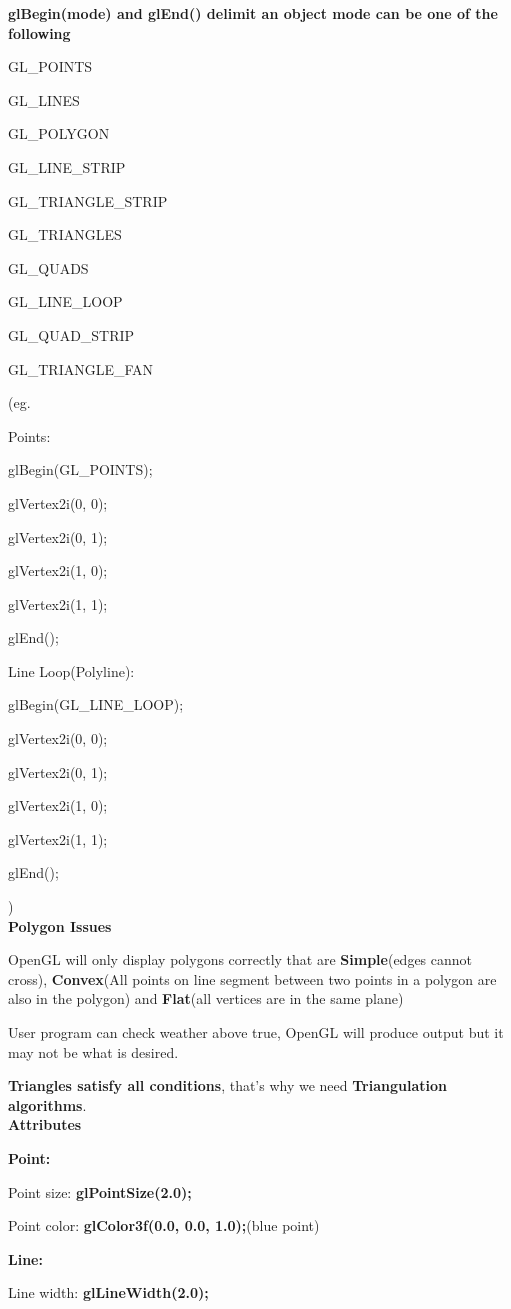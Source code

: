 \documentclass[]{report}
\begin{document}
\textbf{glBegin(mode) and glEnd() delimit an object mode can be one of the following}

GL\_POINTS

GL\_LINES

GL\_POLYGON

GL\_LINE\_STRIP

GL\_TRIANGLE\_STRIP

GL\_TRIANGLES

GL\_QUADS

GL\_LINE\_LOOP

GL\_QUAD\_STRIP

GL\_TRIANGLE\_FAN

(eg.

Points:

glBegin(GL\_POINTS);

glVertex2i(0, 0);

glVertex2i(0, 1);

glVertex2i(1, 0);

glVertex2i(1, 1);

glEnd();

Line Loop(Polyline):

glBegin(GL\_LINE\_LOOP);

glVertex2i(0, 0);

glVertex2i(0, 1);

glVertex2i(1, 0);

glVertex2i(1, 1);

glEnd();

)\\
\textbf{Polygon Issues}

OpenGL will only display polygons correctly that are \textbf{Simple}(edges cannot cross), \textbf{Convex}(All points on line segment between two points in a polygon are also in the polygon) and \textbf{Flat}(all vertices are in the same plane)

User program can check weather above true, OpenGL will produce output but it may not be what is desired.

\textbf{Triangles satisfy all conditions}, that's why we need \textbf{Triangulation algorithms}.\\
\textbf{Attributes}

\textbf{Point:}

Point size: \textbf{glPointSize(2.0);}

Point color: \textbf{glColor3f(0.0, 0.0, 1.0);}(blue point)

\textbf{Line:}

Line width: \textbf{glLineWidth(2.0);}
\end{document}
